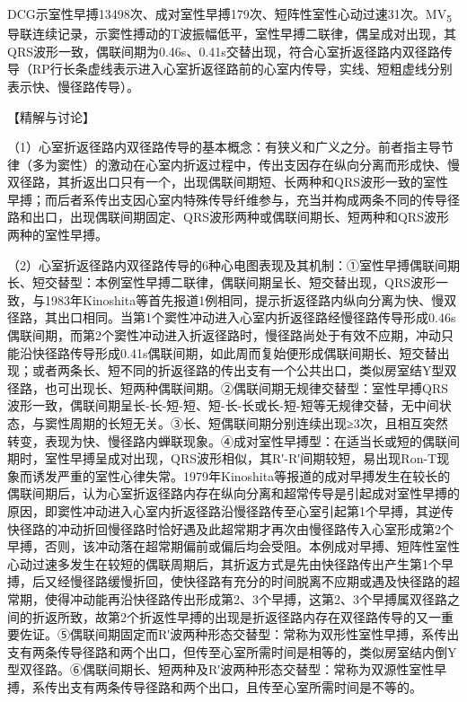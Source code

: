 DCG示室性早搏13498次、成对室性早搏179次、短阵性室性心动过速31次。MV\textsubscript{5}
导联连续记录，示窦性搏动的T波振幅低平，室性早搏二联律，偶呈成对出现，其QRS波形一致，偶联间期为0.46s、0.41s交替出现，符合心室折返径路内双径路传导（RP行长条虚线表示进入心室折返径路前的心室内传导，实线、短粗虚线分别表示快、慢径路传导）。

【精解与讨论】

（1）心室折返径路内双径路传导的基本概念：有狭义和广义之分。前者指主导节律（多为窦性）的激动在心室内折返过程中，传出支因存在纵向分离而形成快、慢双径路，其折返出口只有一个，出现偶联间期短、长两种和QRS波形一致的室性早搏；而后者系传出支因心室内特殊传导纤维参与，充当并构成两条不同的传导径路和出口，出现偶联间期固定、QRS波形两种或偶联间期长、短两种和QRS波形两种的室性早搏。

（2）心室折返径路内双径路传导的6种心电图表现及其机制：①室性早搏偶联间期长、短交替型：本例室性早搏二联律，偶联间期呈长、短交替出现，QRS波形一致，与1983年Kinoshita等首先报道1例相同，提示折返径路内纵向分离为快、慢双径路，其出口相同。当第1个窦性冲动进入心室内折返径路经慢径路传导形成0.46s偶联间期，而第2个窦性冲动进入折返径路时，慢径路尚处于有效不应期，冲动只能沿快径路传导形成0.41s偶联间期，如此周而复始便形成偶联间期长、短交替出现；或者两条长、短不同的折返径路的传出支有一个公共出口，类似房室结Y型双径路，也可出现长、短两种偶联间期。②偶联间期无规律交替型：室性早搏QRS波形一致，偶联间期呈长-长-短-短、短-长-长或长-短-短等无规律交替，无中间状态，与窦性周期的长短无关。③长、短偶联间期分别连续出现≥3次，且相互突然转变，表现为快、慢径路内蝉联现象。④成对室性早搏型：在适当长或短的偶联间期时，室性早搏呈成对出现，QRS波形相似，其R′-R′间期较短，易出现Ron-T现象而诱发严重的室性心律失常。1979年Kinoshita等报道的成对早搏发生在较长的偶联间期后，认为心室折返径路内存在纵向分离和超常传导是引起成对室性早搏的原因，即窦性冲动进入心室内折返径路沿慢径路传至心室引起第1个早搏，其逆传快径路的冲动折回慢径路时恰好遇及此超常期才再次由慢径路传入心室形成第2个早搏，否则，该冲动落在超常期偏前或偏后均会受阻。本例成对早搏、短阵性室性心动过速多发生在较短的偶联周期后，其折返方式是先由快径路传出产生第1个早搏，后又经慢径路缓慢折回，使快径路有充分的时间脱离不应期或遇及快径路的超常期，使得冲动能再沿快径路传出形成第2、3个早搏，这第2、3个早搏属双径路之间的折返所致，故第2个折返性早搏的出现是折返径路内存在双径路传导的又一重要佐证。⑤偶联间期固定而R′波两种形态交替型：常称为双形性室性早搏，系传出支有两条传导径路和两个出口，但传至心室所需时间是相等的，类似房室结内倒Y型双径路。⑥偶联间期长、短两种及R′波两种形态交替型：常称为双源性室性早搏，系传出支有两条传导径路和两个出口，且传至心室所需时间是不等的。

